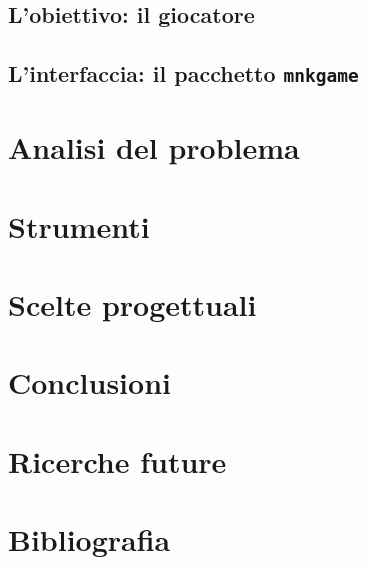 \documentclass[a4paper]{article}
\begin{document}
\subsection{L'obiettivo: il giocatore}

\subsection{L'interfaccia: il pacchetto \texttt{mnkgame}}

\section{Analisi del problema}

\section{Strumenti}

\section{Scelte progettuali}

\section{Conclusioni}

\section{Ricerche future}

\section{Bibliografia}
\end{document}
